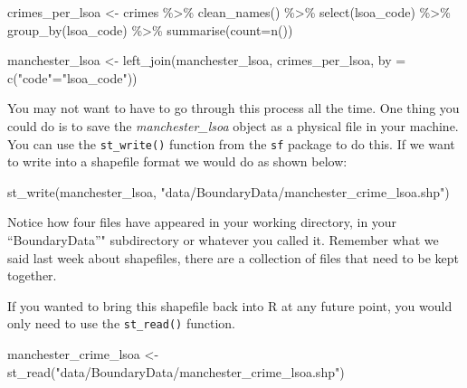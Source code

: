 \documentclass[
]{book}
\newenvironment{Shaded}{\begin{snugshade}}{\end{snugshade}}
\newcommand{\AttributeTok}[1]{\textcolor[rgb]{0.77,0.63,0.00}{#1}}
\newcommand{\FunctionTok}[1]{\textcolor[rgb]{0.00,0.00,0.00}{#1}}
\newcommand{\NormalTok}[1]{#1}
\newcommand{\OtherTok}[1]{\textcolor[rgb]{0.56,0.35,0.01}{#1}}
\newcommand{\SpecialCharTok}[1]{\textcolor[rgb]{0.00,0.00,0.00}{#1}}
\newcommand{\StringTok}[1]{\textcolor[rgb]{0.31,0.60,0.02}{#1}}
\begin{document}
\begin{Shaded}
\begin{Highlighting}[]
\NormalTok{crimes\_per\_lsoa }\OtherTok{\textless{}{-}}\NormalTok{ crimes }\SpecialCharTok{\%\textgreater{}\%}
  \FunctionTok{clean\_names}\NormalTok{() }\SpecialCharTok{\%\textgreater{}\%} 
  \FunctionTok{select}\NormalTok{(lsoa\_code) }\SpecialCharTok{\%\textgreater{}\%}
  \FunctionTok{group\_by}\NormalTok{(lsoa\_code) }\SpecialCharTok{\%\textgreater{}\%}
  \FunctionTok{summarise}\NormalTok{(}\AttributeTok{count=}\FunctionTok{n}\NormalTok{())}

\NormalTok{manchester\_lsoa }\OtherTok{\textless{}{-}} \FunctionTok{left\_join}\NormalTok{(manchester\_lsoa, crimes\_per\_lsoa, }\AttributeTok{by =} \FunctionTok{c}\NormalTok{(}\StringTok{"code"}\OtherTok{=}\StringTok{"lsoa\_code"}\NormalTok{))}
\end{Highlighting}
\end{Shaded}

You may not want to have to go through this process all the time. One thing you could do is to save the \emph{manchester\_lsoa} object as a physical file in your machine. You can use the \texttt{st\_write()} function from the \texttt{sf} package to do this. If we want to write into a shapefile format we would do as shown below:

\begin{Shaded}
\begin{Highlighting}[]
\FunctionTok{st\_write}\NormalTok{(manchester\_lsoa, }\StringTok{"data/BoundaryData/manchester\_crime\_lsoa.shp"}\NormalTok{)}
\end{Highlighting}
\end{Shaded}

Notice how four files have appeared in your working directory, in your ``BoundaryData''" subdirectory or whatever you called it. Remember what we said last week about shapefiles, there are a collection of files that need to be kept together.

If you wanted to bring this shapefile back into R at any future point, you would only need to use the \texttt{st\_read()} function.

\begin{Shaded}
\begin{Highlighting}[]
\NormalTok{manchester\_crime\_lsoa }\OtherTok{\textless{}{-}} \FunctionTok{st\_read}\NormalTok{(}\StringTok{"data/BoundaryData/manchester\_crime\_lsoa.shp"}\NormalTok{)}
\end{Highlighting}
\end{Shaded}
\end{document}
